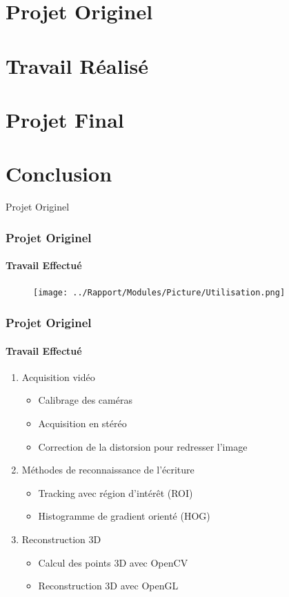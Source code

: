 \documentclass[12pt]{beamer}
\begin{document}
\section{Projet Originel}
\section{Travail Réalisé}
\section{Projet Final}
\section{Conclusion}

\begin{frame}
\Huge{\centerline{Projet Originel}}
\end{frame}

\begin{frame}
\frametitle{Projet Originel}
\framesubtitle{Travail Effectué}
\begin{figure}
\texttt{[image: ../Rapport/Modules/Picture/Utilisation.png]}
\end{figure}
\end{frame}

\begin{frame}
\frametitle{Projet Originel}
\framesubtitle{Travail Effectué}
\begin{enumerate}
\item Acquisition vidéo
\begin{itemize}
\item Calibrage des caméras
\item Acquisition en stéréo
\item Correction de la distorsion pour redresser l'image
\end{itemize}
\item Méthodes de reconnaissance de l'écriture
\begin{itemize}
\item Tracking avec région d'intérêt (ROI)
\item Histogramme de gradient orienté (HOG)
\end{itemize}
\item Reconstruction 3D
\begin{itemize}
\item Calcul des points 3D avec OpenCV
\item Reconstruction 3D avec OpenGL
\end{itemize}
\end{enumerate}
\end{frame}
\end{document}
